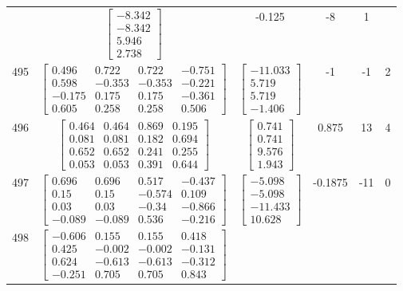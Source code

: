\documentclass[a4paper,12pt]{article}
\begin{document}
\begin{tabular}{c c c c c c}
&
$\begin{bmatrix} -8.342 \\ -8.342 \\ 5.946 \\ 2.738 \end{bmatrix}$
&
-0.125
&
-8
&
1
\\
495
&
$\begin{bmatrix} 0.496 & 0.722 & 0.722 & -0.751 \\ 0.598 & -0.353 & -0.353 & -0.221 \\ -0.175 & 0.175 & 0.175 & -0.361 \\ 0.605 & 0.258 & 0.258 & 0.506 \end{bmatrix}$
&
$\begin{bmatrix} -11.033 \\ 5.719 \\ 5.719 \\ -1.406 \end{bmatrix}$
&
-1
&
-1
&
2
\\
496
&
$\begin{bmatrix} 0.464 & 0.464 & 0.869 & 0.195 \\ 0.081 & 0.081 & 0.182 & 0.694 \\ 0.652 & 0.652 & 0.241 & 0.255 \\ 0.053 & 0.053 & 0.391 & 0.644 \end{bmatrix}$
&
$\begin{bmatrix} 0.741 \\ 0.741 \\ 9.576 \\ 1.943 \end{bmatrix}$
&
0.875
&
13
&
4
\\
497
&
$\begin{bmatrix} 0.696 & 0.696 & 0.517 & -0.437 \\ 0.15 & 0.15 & -0.574 & 0.109 \\ 0.03 & 0.03 & -0.34 & -0.866 \\ -0.089 & -0.089 & 0.536 & -0.216 \end{bmatrix}$
&
$\begin{bmatrix} -5.098 \\ -5.098 \\ -11.433 \\ 10.628 \end{bmatrix}$
&
-0.1875
&
-11
&
0
\\
498
&
$\begin{bmatrix} -0.606 & 0.155 & 0.155 & 0.418 \\ 0.425 & -0.002 & -0.002 & -0.131 \\ 0.624 & -0.613 & -0.613 & -0.312 \\ -0.251 & 0.705 & 0.705 & 0.843 \end{bmatrix}$

\end{tabular}
\end{document}
